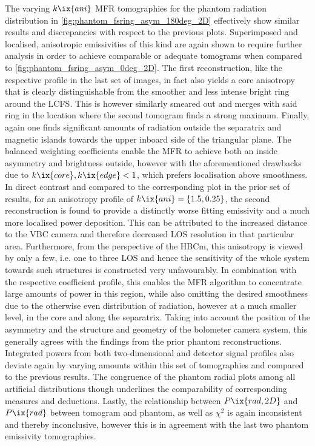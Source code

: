                The varying $k\ix{ani}$ MFR tomographies for the phantom radiation distribution in \cref{fig:phantom_fsring_asym_180deg_2D} effectively show similar results and discrepancies with respect to the previous plots. Superimposed and localised, anisotropic emissivities of this kind are again shown to require further analysis in order to achieve comparable or adequate tomograms when compared to \cref{fig:phantom_fsring_asym_0deg_2D}. The first reconstruction, like the respective profile in the last set of images, in fact also yields a core anisotropy that is clearly distinguishable from the smoother and less intense bright ring around the LCFS. This is however similarly smeared out and merges with said ring in the location where the second tomogram finds a strong maximum. Finally, again one finds significant amounts of radiation outside the separatrix and magnetic islands towards the upper inboard side of the triangular plane. The balanced weighting coefficients enable the MFR to achieve both an inside asymmetry and brightness outside, however with the aforementioned drawbacks due to $k\ix{core},k\ix{edge}<1$, which prefers localisation above smoothness. In direct contrast and compared to the corresponding plot in the prior set of results, for an anisotropy profile of $k\ix{ani}=\left\{1.5, 0.25\right\}$, the second reconstruction is found to provide a distinctly worse fitting emissivity and a much more localised power deposition. This can be attributed to the increased distance to the VBC camera and therefore decreased LOS resolution in that particular area. Furthermore, from the perspective of the HBCm, this anisotropy is viewed by only a few, i.e. one to three LOS and hence the sensitivity of the whole system towards such structures is constructed very unfavourably. In combination with the respective coefficient profile, this enables the MFR algorithm to concentrate large amounts of power in this region, while also omitting the desired smoothness due to the otherwise even distribution of radiation, however at a much smaller level, in the core and along the separatrix. Taking into account the position of the asymmetry and the structure and geometry of the bolometer camera system, this generally agrees with the findings from the prior phantom reconstructions. Integrated powers from both two-dimensional and detector signal profiles also deviate again by varying amounts within this set of tomographies and compared to the previous results. The congruence of the phantom radial plots among all artificial distributions though underlines the comparability of corresponding measures and deductions. Lastly, the relationship between $P\ix{rad,2D}$ and $P\ix{rad}$ between tomogram and phantom, as well as $\chi^{2}$ is again inconsistent and thereby inconclusive, however this is in agreement with the last two phantom emissivity tomographies.%
%

